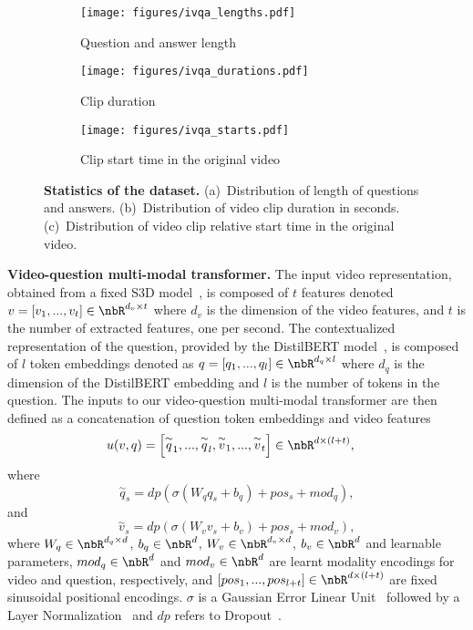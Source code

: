 \begin{figure}[t]
\centering
\begin{subfigure}{.5\textwidth}
\texttt{[image: figures/ivqa\_lengths.pdf]}
\caption{Question and answer length}
\end{subfigure}
\begin{subfigure}{.5\textwidth}
\texttt{[image: figures/ivqa\_durations.pdf]}
\caption{Clip duration}
\end{subfigure}
\begin{subfigure}{.5\textwidth}
\texttt{[image: figures/ivqa\_starts.pdf]}
\caption{Clip start time in the original video}
\end{subfigure}
\vspace{-.3cm}
\caption{{\bf Statistics of the \smalldatasetname{} dataset.} (a)~Distribution of length of questions and answers. (b)~Distribution of video clip duration in seconds. (c)~Distribution of video clip relative start time in the original video.}
\label{fig:length}
\vspace{-.6cm}
\end{figure}

\noindent \textbf{Video-question multi-modal transformer.} The input video representation, obtained from a fixed S3D model~\cite{xie2018rethinking}, is composed of $t$ features denoted  $v = [v_1, ..., v_t] \in \nbR^{d_v \times t}$ where $d_v$ is the dimension of the video features, and $t$ is the number of extracted features, one per second. 
The contextualized representation of the question, provided by the DistilBERT model~\cite{sanh2019distilbert}, is composed of $l$ token embeddings denoted as $q = [q_1, ..., q_{l}] \in \nbR^{d_q \times l}$ where $d_q$ is the dimension of the DistilBERT embedding and $l$ is the number of tokens in the question. 
The inputs to our video-question multi-modal transformer are then defined as a concatenation of question token embeddings and video features
\begin{equation}
\begin{split}
u(v, q) &= \left[\overset{\sim}{q}_1, ..., \overset{\sim}{q}_l, \overset{\sim}{v}_1, ..., \overset{\sim}{v}_t\right] \in \nbR^{d \times (l+t)},
\end{split}
\end{equation} 
where 
\begin{equation}\overset{\sim}{q}_s = dp\left(\sigma\left(W_q q_s + b_q\right) + pos_s + mod_q\right),\end{equation} 
and 
\begin{equation}\overset{\sim}{v}_s = dp(\sigma(W_v v_s + b_v) + pos_s + mod_v),\end{equation}
where $W_q \in \nbR^{d_q \times d}$, $b_q \in \nbR^{d}$, $W_v \in \nbR^{d_v \times d}$, $b_v \in \nbR^{d}$ and learnable parameters, $mod_q \in \nbR^{d}$ and $mod_v \in \nbR^{d}$ are learnt modality encodings for video and question, respectively, and $[pos_1, ..., pos_{l+t}] \in \nbR^{d \times (l+t)}$ are fixed sinusoidal positional encodings. $\sigma$ is a Gaussian Error Linear Unit~\cite{hendrycks2016gaussian} followed by a Layer Normalization~\cite{ba2016layer} and $dp$ refers to Dropout~\cite{srivastava2014dropout}.

